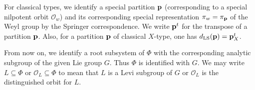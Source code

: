 \documentclass[reqno,12pt]{amsart}
\numberwithin{equation}{section}
\theoremstyle{plain}
\theoremstyle{definition}
\begin{document}
For classical types, we identify a special partition ${\bf p}$ (corresponding to a special nilpotent orbit $\mathcal{O}_w$) and its corresponding special representation $\pi_w=\pi_{\bf p}$ of the Weyl group by the Springer correspondence. We write ${\bf p}^t$ for the transpose of a partition ${\bf p}$. Also, for a partition ${\bf p}$ of classical $X$-type, one has $d_{\rm LS}({\bf p}) = {\bf p}^t_X$.

From now on, we identify a root subsystem  of $\Phi$ with the corresponding analytic subgroup of the given Lie group $G$. Thus $\Phi$ is identified with $G$. We may write $L\subseteq \Phi$ or $\mathcal{O}_L\subseteq \Phi$ to mean that $L$ is a Levi subgroup of $G$ or $\mathcal{O}_L$ is the distinguished orbit for $L$.

\end{document}
